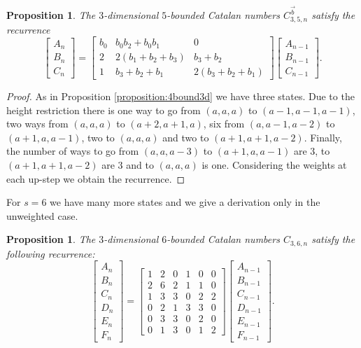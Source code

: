 \documentclass[12pt,notitlepage]{amsart}
\numberwithin{equation}{section}
\theoremstyle{thmstyleone}%
\newtheorem{proposition}[theorem]{Proposition}%
\theoremstyle{thmstyletwo}%
\theoremstyle{thmstylethree}%
\numberwithin{theorem}{section}
\numberwithin{equation}{section}
\begin{document}
\begin{proposition}
    The $3$-dimensional $5$-bounded Catalan numbers $C^{\vec{b}}_{3,5,n}$ satisfy the recurrence 
     \[\begin{bmatrix}
A_n \\
B_n \\
C_n
\end{bmatrix} =
\begin{bmatrix}
b_0 & b_0b_2+b_0b_1 & 0 \\
2 & 2(b_1+b_2+b_3) & b_3+b_2 \\
1 & b_3+b_2+b_1 & 2(b_3+b_2+b_1)
\end{bmatrix}
     \begin{bmatrix}
A_{n-1} \\
B_{n-1} \\
C_{n-1}
\end{bmatrix}.
\]

\end{proposition}
\begin{proof}
  As in Proposition \ref{proposition:4bound3d} we have three states. Due to the height restriction there is one way to go from $(a,a,a)$ to $(a-1,a-1,a-1)$, two ways from $(a,a,a)$ to $(a+2,a+1,a)$, six from $(a,a-1,a-2)$ to $(a+1,a,a-1)$, two to $(a,a,a)$ and two to $(a+1,a+1,a-2)$. Finally, the number of ways to go from $(a,a,a-3)$ to $(a+1,a,a-1)$ are $3$, to $(a+1,a+1,a-2)$ are $3$ and to $(a,a,a)$ is one. Considering the weights at each up-step we obtain the recurrence.
\end{proof}

For $s=6$ we have many more states and we give a derivation only in the unweighted case.

\begin{proposition}
    
    The $3$-dimensional $6$-bounded Catalan numbers $C_{3,6,n}$ satisfy the following recurrence:
    \[\begin{bmatrix}
A_n \\
B_n \\
C_n \\
D_n \\
E_n \\ 
F_n 
\end{bmatrix} =
\begin{bmatrix}
 1 & 2 & 0 & 1 & 0 & 0\\
2 & 6 & 2 & 1 & 1 & 0 \\
1 & 3 & 3 & 0 & 2 & 2 \\
0 & 2 & 1 & 3 & 3 & 0 \\
0 & 3 & 3 & 0 & 2 & 0 \\
0 & 1 & 3 & 0 & 1 & 2
\end{bmatrix}
\begin{bmatrix}
A_{n-1} \\
B_{n-1} \\
C_{n-1} \\
D_{n-1} \\
E_{n-1} \\ 
F_{n-1} 
\end{bmatrix}.
\]
\end{proposition}
\end{document}
